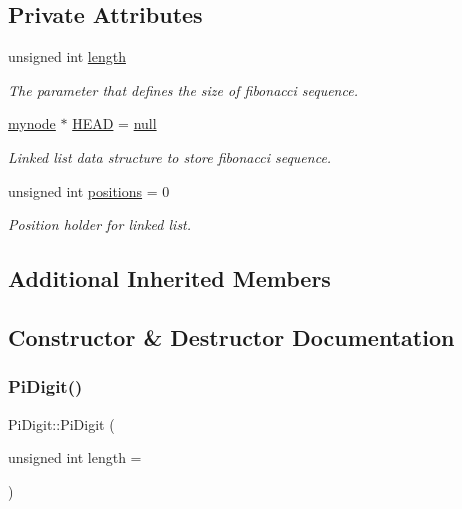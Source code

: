 \subsection*{Private Attributes}
\begin{DoxyCompactItemize}
\item 
unsigned int \mbox{\hyperlink{classPiDigit_adeaaf0996ef9c846df7ba38b4949ad99}{length}}
\begin{DoxyCompactList}\small\item\em The parameter that defines the size of fibonacci sequence. \end{DoxyCompactList}\item 
\mbox{\hyperlink{structPiDigit_1_1mynode}{mynode}} $\ast$ \mbox{\hyperlink{classPiDigit_acd2ff3ad1661062acf9a0fd1446e2fbe}{H\+E\+AD}} = \mbox{\hyperlink{FibDigit_8hpp_ac97b8ee753e4405397a42ad5799b0f9e}{null}}
\begin{DoxyCompactList}\small\item\em Linked list data structure to store fibonacci sequence. \end{DoxyCompactList}\item 
unsigned int \mbox{\hyperlink{classPiDigit_a2ddc1d48a6436aa32ba4ac5a4567d50c}{positions}} = 0
\begin{DoxyCompactList}\small\item\em Position holder for linked list. \end{DoxyCompactList}\end{DoxyCompactItemize}
\subsection*{Additional Inherited Members}


\subsection{Constructor \& Destructor Documentation}
\mbox{\label{classPiDigit_a6c2d826e03edc8390476d0002aaa2d46}} 
\subsubsection{\texorpdfstring{Pi\+Digit()}{PiDigit()}}
{\footnotesize\ttfamily Pi\+Digit\+::\+Pi\+Digit (\begin{DoxyParamCaption}\item[{unsigned int}]{length = {} }\end{DoxyParamCaption})\hspace{0.3cm}{\ttfamily [inline]}}

